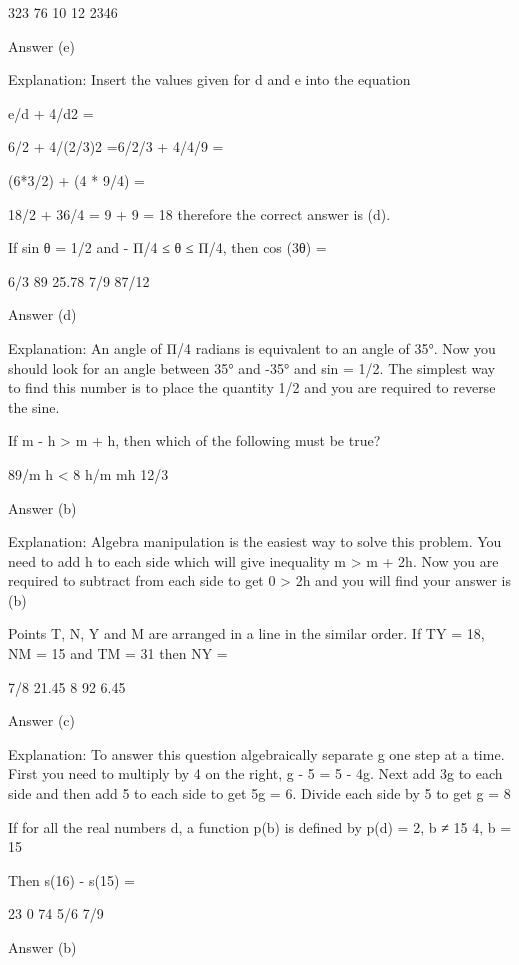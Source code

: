         323
        76
        10
        12
        2346 

    Answer (e)

    Explanation: Insert the values given for d and e into the equation

    e/d + 4/d2 =

    6/2 + 4/(2/3)2 =6/2/3 + 4/4/9 =

    (6*3/2) + (4 * 9/4) =

    18/2 + 36/4 = 9 + 9 = 18 therefore the correct answer is (d).

    If sin θ = 1/2 and - Π/4 ≤ θ ≤ Π/4, then cos (3θ) =

          6/3
          89
          25.78
          7/9
          87/12 

    Answer (d)

    Explanation: An angle of Π/4 radians is equivalent to an angle of 35°. Now you should look for an angle between 35° and -35° and sin = 1/2. The simplest way to find this number is to place the quantity 1/2 and you are required to reverse the sine.

    If m - h > m + h, then which of the following must be true?

        89/m
        h < 8
        h/m
        mh
        12/3 

    Answer (b)

    Explanation: Algebra manipulation is the easiest way to solve this problem. You need to add h to each side which will give inequality m > m + 2h. Now you are required to subtract from each side to get 0 > 2h and you will find your answer is (b)

    Points T, N, Y and M are arranged in a line in the similar order. If TY = 18, NM = 15 and TM = 31 then NY =

        7/8
        21.45
        8
        92
        6.45 

    Answer (c)

    Explanation: To answer this question algebraically separate g one step at a time. First you need to multiply by 4 on the right, g - 5 = 5 - 4g. Next add 3g to each side and then add 5 to each side to get 5g = 6. Divide each side by 5 to get g = 8

    If for all the real numbers d, a function p(b) is defined by p(d) = {2, b ≠ 15 4, b = 15}

    Then s(16) - s(15) =

        23
        0
        74
        5/6
        7/9 

    Answer (b)

